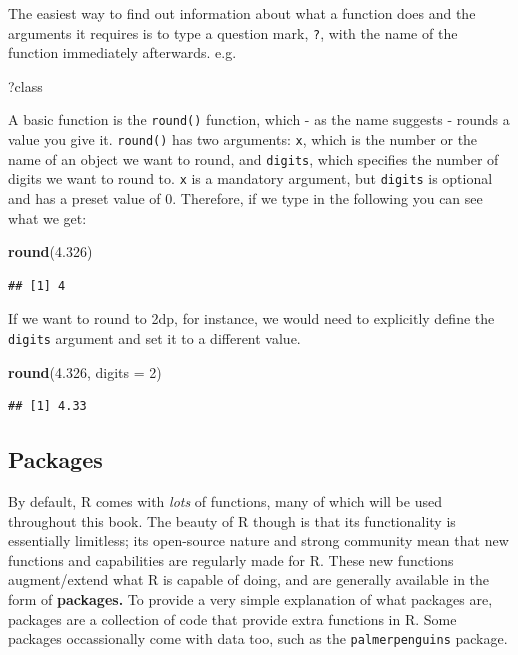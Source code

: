 \documentclass[
]{book}
\newenvironment{Shaded}{\begin{snugshade}}{\end{snugshade}}
\newcommand{\AttributeTok}[1]{\textcolor[rgb]{0.13,0.29,0.53}{#1}}
\newcommand{\DecValTok}[1]{\textcolor[rgb]{0.00,0.00,0.81}{#1}}
\newcommand{\FloatTok}[1]{\textcolor[rgb]{0.00,0.00,0.81}{#1}}
\newcommand{\FunctionTok}[1]{\textcolor[rgb]{0.13,0.29,0.53}{\textbf{#1}}}
\newcommand{\NormalTok}[1]{#1}
\begin{document}
The easiest way to find out information about what a function does and the arguments it requires is to type a question mark, \texttt{?}, with the name of the function immediately afterwards. e.g.~

\begin{Shaded}
\begin{Highlighting}[]
\NormalTok{?class}
\end{Highlighting}
\end{Shaded}

A basic function is the \texttt{round()} function, which - as the name suggests - rounds a value you give it. \texttt{round()} has two arguments: \texttt{x}, which is the number or the name of an object we want to round, and \texttt{digits}, which specifies the number of digits we want to round to. \texttt{x} is a mandatory argument, but \texttt{digits} is optional and has a preset value of 0. Therefore, if we type in the following you can see what we get:

\begin{Shaded}
\begin{Highlighting}[]
\FunctionTok{round}\NormalTok{(}\FloatTok{4.326}\NormalTok{)}
\end{Highlighting}
\end{Shaded}

\begin{verbatim}
## [1] 4
\end{verbatim}

If we want to round to 2dp, for instance, we would need to explicitly define the \texttt{digits} argument and set it to a different value.

\begin{Shaded}
\begin{Highlighting}[]
\FunctionTok{round}\NormalTok{(}\FloatTok{4.326}\NormalTok{, }\AttributeTok{digits =} \DecValTok{2}\NormalTok{)}
\end{Highlighting}
\end{Shaded}

\begin{verbatim}
## [1] 4.33
\end{verbatim}

\subsection{Packages}\label{packages}

By default, R comes with \emph{lots} of functions, many of which will be used throughout this book. The beauty of R though is that its functionality is essentially limitless; its open-source nature and strong community mean that new functions and capabilities are regularly made for R. These new functions augment/extend what R is capable of doing, and are generally available in the form of \textbf{packages.} To provide a very simple explanation of what packages are, packages are a collection of code that provide extra functions in R. Some packages occassionally come with data too, such as the \texttt{palmerpenguins} package.
\end{document}

